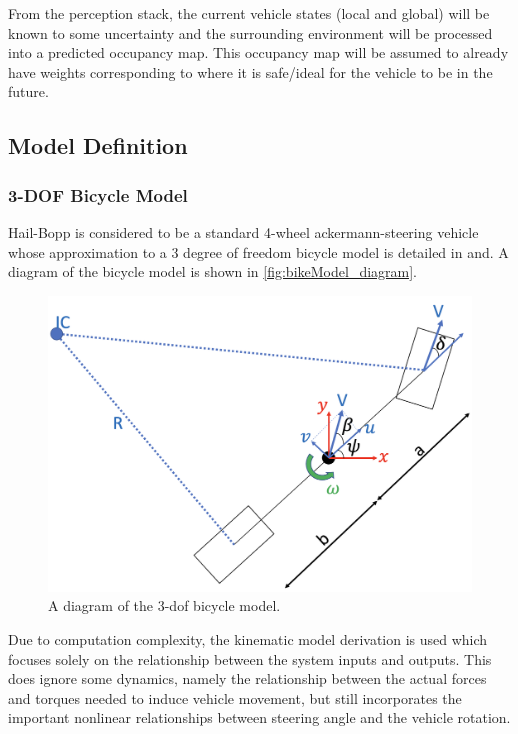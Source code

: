 \documentclass[]{IEEEtran}
\begin{document}
From the perception stack, the current vehicle states (local and global) will be known to some uncertainty and the surrounding environment will be processed into a predicted occupancy map.
This occupancy map will be assumed to already have weights corresponding to where it is safe/ideal for the vehicle to be in the future.

\subsection{Model Definition}
\subsubsection{3-DOF Bicycle Model}\label{subsec:mdl_def}
Hail-Bopp is considered to be a standard 4-wheel ackermann-steering vehicle
whose approximation to a 3 degree of freedom bicycle model is detailed in\cite{casanova_thesis} and\cite{vehcileDynamics_chapter2a}.
A diagram of the bicycle model is shown in \autoref{fig:bikeModel_diagram}.

\begin{figure}[h]
    \centering
    \includegraphics[width=0.9\columnwidth]{figs/BicycleModel.png}
    \caption{A diagram of the 3-dof bicycle model.}
\label{fig:bikeModel_diagram}
\end{figure}

Due to computation complexity, the kinematic model derivation is used which focuses solely on the relationship between the system inputs and outputs.
This does ignore some dynamics, namely the relationship between the actual forces and torques needed to induce vehicle movement, but still incorporates the important nonlinear relationships between steering angle and the vehicle rotation.
\end{document}
